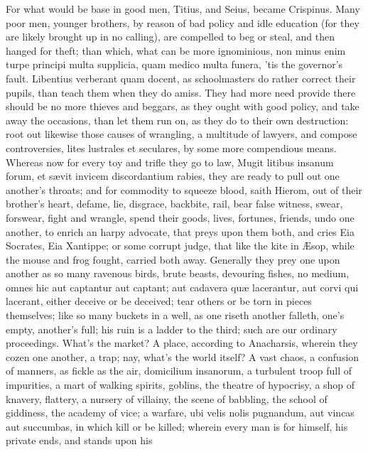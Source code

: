 {For what would be base in good men, Titius, and Seius, became
Crispinus.
Many poor men, younger brothers, \etc{} by reason of bad policy and
idle education (for they are likely brought up in no calling), are
compelled to beg or steal, and then hanged for theft; than which, what
can be more ignominious, non minus enim turpe principi multa supplicia,
quam medico multa funera, 'tis the governor's fault. Libentius
verberant quam docent, as schoolmasters do rather correct their pupils,
than teach them when they do amiss. They had more need provide
there should be no more thieves and beggars, as they ought with good
policy, and take away the occasions, than let them run on, as they do
to their own destruction: root out likewise those causes of wrangling,
a multitude of lawyers, and compose controversies, lites lustrales et
seculares, by some more compendious means. Whereas now for every toy
and trifle they go to law, Mugit litibus insanum forum, et s\ae{}vit
invicem discordantium rabies, they are ready to pull out one another's
throats; and for commodity to squeeze blood, saith Hierom, out of
their brother's heart, defame, lie, disgrace, backbite, rail, bear
false witness, swear, forswear, fight and wrangle, spend their goods,
lives, fortunes, friends, undo one another, to enrich an harpy
advocate, that preys upon them both, and cries Eia Socrates, Eia
Xantippe; or some corrupt judge, that like the kite in \AE{}sop,
while the mouse and frog fought, carried both away. Generally they prey
one upon another as so many ravenous birds, brute beasts, devouring
fishes, no medium, omnes hic aut captantur aut captant; aut
cadavera qu\ae{} lacerantur, aut corvi qui lacerant, either deceive or be
deceived; tear others or be torn in pieces themselves; like so many
buckets in a well, as one riseth another falleth, one's empty,
another's full; his ruin is a ladder to the third; such are our
ordinary proceedings. What's the market? A place, according to
Anacharsis, wherein they cozen one another, a trap; nay, what's
the world itself? A vast chaos, a confusion of manners, as fickle
as the air, domicilium insanorum, a turbulent troop full of impurities,
a mart of walking spirits, goblins, the theatre of hypocrisy, a shop of
knavery, flattery, a nursery of villainy, the scene of babbling, the
school of giddiness, the academy of vice; a warfare, ubi velis nolis
pugnandum, aut vincas aut succumbas, in which kill or be killed;
wherein every man is for himself, his private ends, and stands upon his
}
